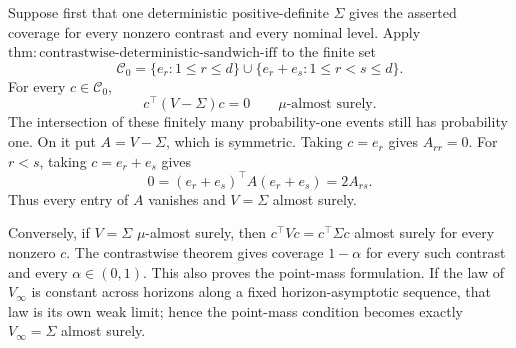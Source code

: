 Suppose first that one deterministic positive-definite \(\Sigma\) gives the
asserted coverage for every nonzero contrast and every nominal level.  Apply
\(\mathrm{thm:contrastwise\text{-}deterministic\text{-}sandwich\text{-}iff}\)
to the finite set
\[
 \mathcal C_0=\{e_r:1\le r\le d\}\cup
 \{e_r+e_s:1\le r<s\le d\}.
\tag{1}
\]
For every \(c\in\mathcal C_0\),
\[
 c^\top(V-\Sigma)c=0\qquad\mu\text{-almost surely}.
\tag{2}
\]
The intersection of these finitely many probability-one events still has
probability one.  On it put \(A=V-\Sigma\), which is symmetric.  Taking
\(c=e_r\) gives \(A_{rr}=0\).  For \(r<s\), taking \(c=e_r+e_s\) gives
\[
 0=(e_r+e_s)^\top A(e_r+e_s)=2A_{rs}.
\tag{3}
\]
Thus every entry of \(A\) vanishes and \(V=\Sigma\) almost surely.

Conversely, if \(V=\Sigma\) \(\mu\)-almost surely, then
\(c^\top Vc=c^\top\Sigma c\) almost surely for every nonzero \(c\).  The
contrastwise theorem gives coverage \(1-\alpha\) for every such contrast
and every \(\alpha\in(0,1)\).  This also proves the point-mass formulation.
If the law of \(V_\infty\) is constant across horizons along a fixed
horizon-asymptotic sequence, that law is its own weak limit; hence the
point-mass condition becomes exactly \(V_\infty=\Sigma\) almost surely.